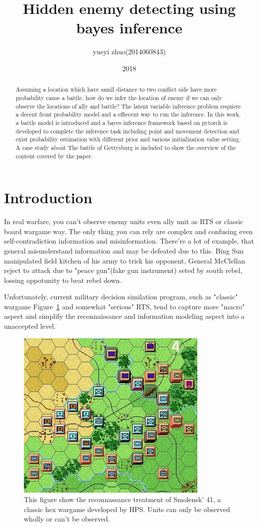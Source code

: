 \documentclass{article}
\title{Hidden enemy detecting using bayes inference}
\author{yueyi zhuo(2014060843)}
\date{2018}
\begin{document}
\maketitle

\begin{abstract}

Assuming a location which have samll distance to two conflict side have more probability cause a battle,
how do we infer the location of enemy if we can only observe the locations of ally and battle? The latent
variable inference problem requiere a decent front probability model and a effiecent way to run the 
inference. In this work, a battle model is introduced and a bayes inference framework based on pytorch 
is developed to complete the inference task including point and movement detection and 
exist probability estimation with different prior and various initialization value setting.
A case study about The battle of Gettysburg is included to show the overview of the content covered by the paper.

\end{abstract}

\section{Introduction}

In real warfare, you can't observe enemy units even ally unit as RTS or classic board wargame way.
The only thing you can rely are complex and confusing even self-contradiction information and misinformation.
There're a lot of example, that general misunderstand information and may be defeated due to this. 
Bing Sun manipulated field kitchen of his army to trick his opponent, General McClellan reject to attack
due to "peace gun"(fake gun instrument) seted by south rebel, lossing oppotunity to beat rebel down.

Unfortunately, current military decision similation program, such as "classic" wargame Figure~\ref{fig:hps} and somewhat 
"serious" RTS, tend to capture more "macro" aspect and simplify the reconnaissance and 
information modeling aspect into a unaccepted level.

\begin{figure}[h]
\includegraphics[width=0.6\linewidth]{SmolenskR4.jpg}
\caption{This figure show the reconnassance treatment of Smolensk' 41, 
a classic hex wargame developed by HPS.
Units can only be observed wholly or can't be observed. }
\label{fig:hps}
\end{figure}
\end{document}
